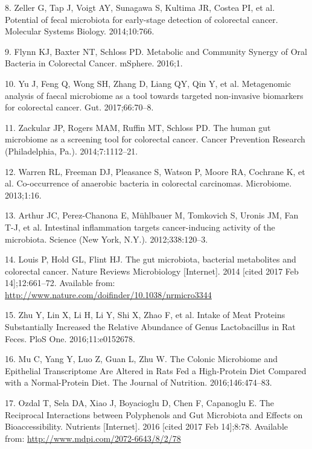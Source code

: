 \documentclass[12pt,]{article}
\begin{document}
\hypertarget{ref-zeller_potential_2014}{}
8. Zeller G, Tap J, Voigt AY, Sunagawa S, Kultima JR, Costea PI, et al.
Potential of fecal microbiota for early-stage detection of colorectal
cancer. Molecular Systems Biology. 2014;10:766.

\hypertarget{ref-flynn_metabolic_2016}{}
9. Flynn KJ, Baxter NT, Schloss PD. Metabolic and Community Synergy of
Oral Bacteria in Colorectal Cancer. mSphere. 2016;1.

\hypertarget{ref-yu_metagenomic_2017}{}
10. Yu J, Feng Q, Wong SH, Zhang D, Liang QY, Qin Y, et al. Metagenomic
analysis of faecal microbiome as a tool towards targeted non-invasive
biomarkers for colorectal cancer. Gut. 2017;66:70--8.

\hypertarget{ref-zackular_human_2014}{}
11. Zackular JP, Rogers MAM, Ruffin MT, Schloss PD. The human gut
microbiome as a screening tool for colorectal cancer. Cancer Prevention
Research (Philadelphia, Pa.). 2014;7:1112--21.

\hypertarget{ref-warren_co-occurrence_2013}{}
12. Warren RL, Freeman DJ, Pleasance S, Watson P, Moore RA, Cochrane K,
et al. Co-occurrence of anaerobic bacteria in colorectal carcinomas.
Microbiome. 2013;1:16.

\hypertarget{ref-arthur_intestinal_2012}{}
13. Arthur JC, Perez-Chanona E, Mühlbauer M, Tomkovich S, Uronis JM, Fan
T-J, et al. Intestinal inflammation targets cancer-inducing activity of
the microbiota. Science (New York, N.Y.). 2012;338:120--3.

\hypertarget{ref-louis_gut_2014}{}
14. Louis P, Hold GL, Flint HJ. The gut microbiota, bacterial
metabolites and colorectal cancer. Nature Reviews Microbiology
{[}Internet{]}. 2014 {[}cited 2017 Feb 14{]};12:661--72. Available from:
\url{http://www.nature.com/doifinder/10.1038/nrmicro3344}

\hypertarget{ref-zhu_intake_2016}{}
15. Zhu Y, Lin X, Li H, Li Y, Shi X, Zhao F, et al. Intake of Meat
Proteins Substantially Increased the Relative Abundance of Genus
Lactobacillus in Rat Feces. PloS One. 2016;11:e0152678.

\hypertarget{ref-mu_colonic_2016}{}
16. Mu C, Yang Y, Luo Z, Guan L, Zhu W. The Colonic Microbiome and
Epithelial Transcriptome Are Altered in Rats Fed a High-Protein Diet
Compared with a Normal-Protein Diet. The Journal of Nutrition.
2016;146:474--83.

\hypertarget{ref-ozdal_reciprocal_2016}{}
17. Ozdal T, Sela DA, Xiao J, Boyacioglu D, Chen F, Capanoglu E. The
Reciprocal Interactions between Polyphenols and Gut Microbiota and
Effects on Bioaccessibility. Nutrients {[}Internet{]}. 2016 {[}cited
2017 Feb 14{]};8:78. Available from:
\url{http://www.mdpi.com/2072-6643/8/2/78}
\end{document}
